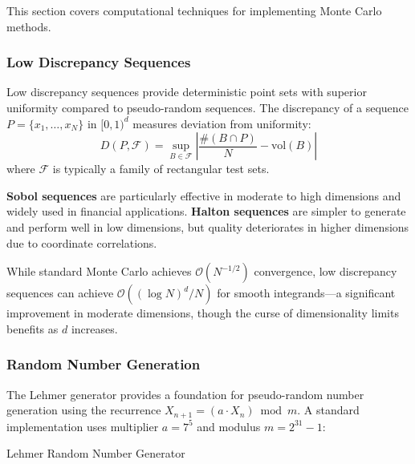 This section covers computational techniques for implementing Monte Carlo methods.

\subsubsection{Low Discrepancy Sequences}
\label{appendix:low_discrepancy}

Low discrepancy sequences provide deterministic point sets with superior uniformity compared to pseudo-random sequences. The discrepancy of a sequence $P = \{x_1, \ldots, x_N\}$ in $[0,1)^d$ measures deviation from uniformity:
\begin{equation*}
D(P, \mathcal{F}) = \sup_{B \in \mathcal{F}} \left| \frac{\#(B \cap P)}{N} - \text{vol}(B) \right|
\end{equation*}
where $\mathcal{F}$ is typically a family of rectangular test sets.

\textbf{Sobol sequences} are particularly effective in moderate to high dimensions and widely used in financial applications. \textbf{Halton sequences} are simpler to generate and perform well in low dimensions, but quality deteriorates in higher dimensions due to coordinate correlations.

While standard Monte Carlo achieves $\mathcal{O}(N^{-1/2})$ convergence, low discrepancy sequences can achieve $\mathcal{O}((\log N)^d/N)$ for smooth integrands—a significant improvement in moderate dimensions, though the curse of dimensionality limits benefits as $d$ increases.

\subsubsection{Random Number Generation}
\label{appendix:rng}

The Lehmer generator provides a foundation for pseudo-random number generation using the recurrence $X_{n+1} = (a \cdot X_n) \bmod m$. A standard implementation uses multiplier $a = 7^5$ and modulus $m = 2^{31} - 1$:

\begin{algorithm}
\caption{Lehmer Random Number Generator}\label{algo:lehmer-rng}
\end{algorithm}

